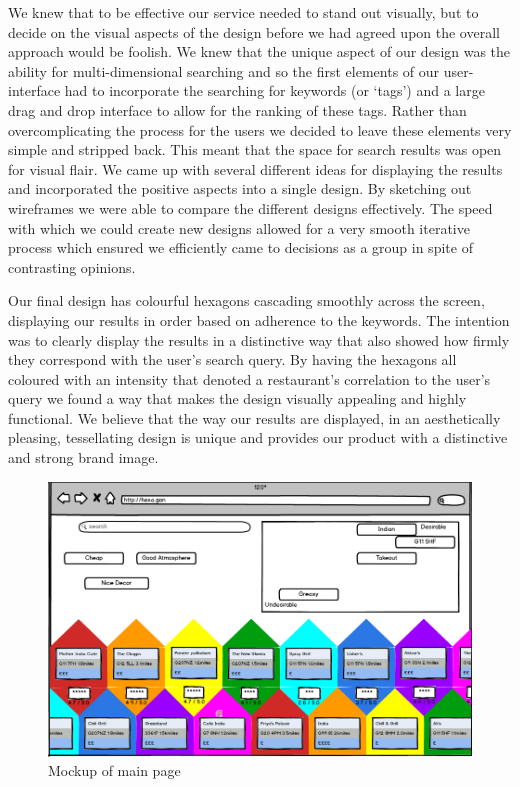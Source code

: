 \documentclass[10pt,a4paper]{article}
\begin{document}
We knew that to be effective our service needed to stand out visually, but to decide on the visual aspects of the design before we had agreed upon the overall approach would be foolish. We knew that the unique aspect of our design was the ability for multi-dimensional searching and so the first elements of our user-interface had to incorporate the searching for keywords (or ‘tags’) and a large drag and drop interface to allow for the ranking of these tags. Rather than overcomplicating the process for the users we decided to leave these elements very simple and stripped back. This meant that the space for search results was open for visual flair. We came up with several different ideas for displaying the results and incorporated the positive aspects into a single design. By sketching out wireframes we were able to compare the different designs effectively. The speed with which we could create new designs allowed for a very smooth iterative process which ensured we efficiently came to decisions as a group in spite of contrasting opinions.

Our final design has colourful hexagons cascading smoothly across the screen, displaying our results in order based on adherence to the keywords. The intention was to clearly display the results in a distinctive way that also showed how firmly they correspond with the user’s search query. By having the hexagons all coloured with an intensity that denoted a restaurant's correlation to the user’s query we found a way that makes the design visually appealing and highly functional. We believe that the way our results are displayed, in an aesthetically pleasing, tessellating  design is unique and provides our product with a distinctive and strong brand image.

\begin{figure}[H]
	\begin{center}
		\includegraphics[scale=0.37]{Screenshot.png}
		\caption{Mockup of main page}
		\label{figure:calc-1}
	\end{center}
\end{figure}
\end{document}
